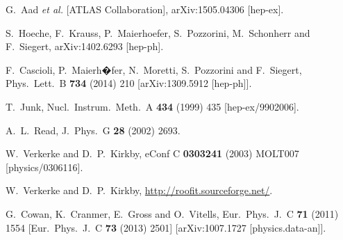 \documentclass[preprintnumbers,superscriptaddress,nofootinbib,aps,prd,floatfix]{revtex4}
\begin{document}
\begin{thebibliography}{99}
  G.~Aad {\it et al.} [ATLAS Collaboration],
  arXiv:1505.04306 [hep-ex].
  
  S.~Hoeche, F.~Krauss, P.~Maierhoefer, S.~Pozzorini, M.~Schonherr and F.~Siegert,
  arXiv:1402.6293 [hep-ph].
  
  F.~Cascioli, P.~Maierh�fer, N.~Moretti, S.~Pozzorini and F.~Siegert,
  Phys.\ Lett.\ B {\bf 734} (2014) 210
  [arXiv:1309.5912 [hep-ph]].
 
  T.~Junk,
  Nucl.\ Instrum.\ Meth.\ A {\bf 434} (1999) 435
  [hep-ex/9902006].
  
  A.~L.~Read,
  J.\ Phys.\ G {\bf 28} (2002) 2693.

  W.~Verkerke and D.~P.~Kirkby,
  eConf C {\bf 0303241} (2003) MOLT007
  [physics/0306116].
  
  W.~Verkerke and D.~P.~Kirkby,
\url{http://roofit.sourceforge.net/}.
  
  G.~Cowan, K.~Cranmer, E.~Gross and O.~Vitells,
  Eur.\ Phys.\ J.\ C {\bf 71} (2011) 1554
   [Eur.\ Phys.\ J.\ C {\bf 73} (2013) 2501]
  [arXiv:1007.1727 [physics.data-an]].


\end{thebibliography}
\end{document}
